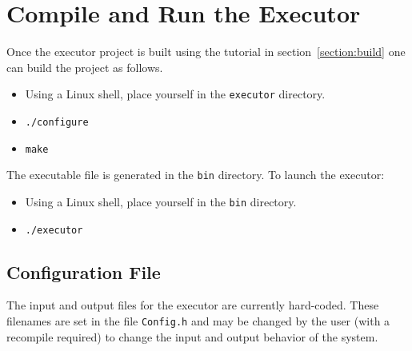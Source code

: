 
\section{Compile and Run the Executor}
Once the executor project is built using the tutorial in section~\ref{section:build} one can build the project as follows.

\begin{itemize}
\item Using a Linux shell, place yourself in the \texttt{executor} directory.
\item \texttt{./configure}
\item \texttt{make}
\end{itemize}

The executable file  is generated in the \texttt{bin} directory. To launch the executor:
\begin{itemize}
\item Using a Linux shell, place yourself in the \texttt{bin} directory.
\item \texttt{./executor}
\end{itemize}

\subsection{Configuration File}
The input and output files for the executor are currently hard-coded. These filenames are set in the file \texttt{Config.h} and may be changed by the user (with a 
recompile required) to change the input and output behavior of the system.